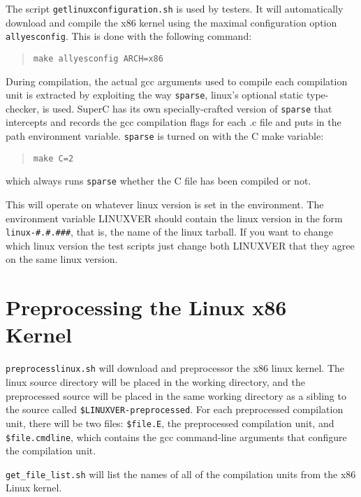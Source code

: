 \documentclass{report}
\begin{document}
The script \verb"getlinuxconfiguration.sh" is used by testers.  It will
automatically download and compile the x86 kernel using the maximal
configuration option \verb"allyesconfig".  This is done with the following
command:

\begin{quote}
\verb"make allyesconfig ARCH=x86"
\end{quote}

During compilation, the actual gcc arguments used to compile each
compilation unit is extracted by exploiting the way \verb"sparse", linux's
optional static type-checker, is used.  SuperC has its own
specially-crafted version of \verb"sparse" that intercepts and records the
gcc compilation flags for each .c file and puts in the path
environment variable.  \verb"sparse" is turned on with the C make variable:

\begin{quote}
\verb"make C=2"
\end{quote}

which always runs \verb"sparse" whether the C file has been compiled or
not.

This will operate on whatever linux version is set in the environment.
The environment variable LINUXVER should contain the linux version in
the form \verb"linux-#.#.###", that is, the name of the linux tarball.
If you want to change which linux version the test scripts just change
both LINUXVER that they agree on the same linux version.



\section{Preprocessing the Linux x86 Kernel}

\verb"preprocesslinux.sh" will download and preprocessor the x86 linux
kernel.  The linux source directory will be placed in the working
directory, and the preprocessed source will be placed in the same
working directory as a sibling to the source called
\verb"$LINUXVER-preprocessed".  For each preprocessed compilation unit,
there will be two files: \verb"$file.E", the preprocessed compilation
unit, and \verb"$file.cmdline", which contains the gcc command-line
arguments that configure the compilation unit.

\verb"get_file_list.sh" will list the names of all of the compilation
units from the x86 Linux kernel.


\end{document}

